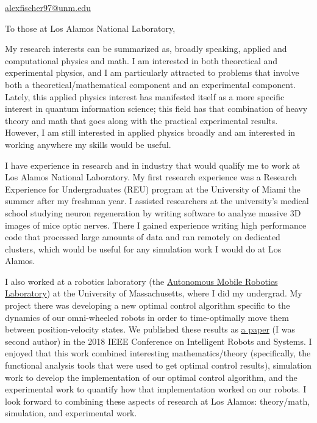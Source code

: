 \documentclass{article}
\title{}
\author{Alex Fischer}
\date{}
\begin{document}
	\maketitle
	\vspace{-3em}
	\begin{center}
		\href{mailto:alexfischer97@unm.edu}{alexfischer97@unm.edu}
	\end{center}
	
	To those at Los Alamos National Laboratory,

	My research interests can be summarized as, broadly speaking, applied and computational physics and math. I am interested in both theoretical and experimental physics, and I am particularly attracted to problems that involve both a theoretical/mathematical component and an experimental component. Lately, this applied physics interest has manifested itself as a more specific interest in quantum information science; this field has that combination of heavy theory and math that goes along with the practical experimental results. However, I am still interested in applied physics broadly and am interested in working anywhere my skills would be useful.
	
	I have experience in research and in industry that would qualify me to work at Los Alamos National Laboratory. My first research experience was a Research Experience for Undergraduates (REU) program at the University of Miami the summer after my freshman year. I assisted researchers at the university's medical school studying neuron regeneration by writing software to analyze massive 3D images of mice optic nerves. There I gained experience writing high performance code that processed large amounts of data and ran remotely on dedicated clusters, which would be useful for any simulation work I would do at Los Alamos. 
	
	I also worked at a robotics laboratory (the \href{https://amrl.cs.umass.edu/}{Autonomous Mobile Robotics Laboratory}) at the University of Massachusetts, where I did my undergrad. My project there was developing a new optimal control algorithm specific to the dynamics of our omni-wheeled robots in order to time-optimally move them between position-velocity states. We published these results as \href{https://arxiv.org/abs/1707.04617}{a paper} (I was second author) in the 2018 IEEE Conference on Intelligent Robots and Systems. I enjoyed that this work combined interesting mathematics/theory (specifically, the functional analysis tools that were used to get optimal control results), simulation work to develop the implementation of our optimal control algorithm, and the experimental work to quantify how that implementation worked on our robots. I look forward to combining these aspects of research at Los Alamos: theory/math, simulation, and experimental work.
\end{document}
